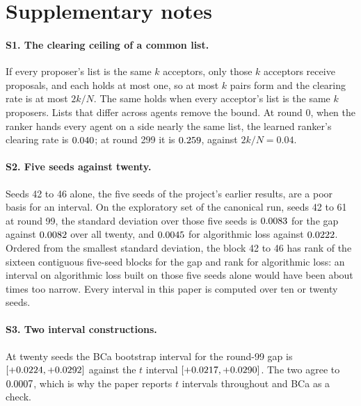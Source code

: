 
\section{Supplementary notes}
\label{app:supplement}

\paragraph{S1. The clearing ceiling of a common list.} If every proposer's list is
the same $k$ acceptors, only those $k$ acceptors receive proposals, and each holds
at most one, so at most $k$ pairs form and the clearing rate is at most $2k/N$.
The same holds when every acceptor's list is the same $k$ proposers. Lists that
differ across agents remove the bound. At round 0, when the ranker hands every
agent on a side nearly the same list, the learned ranker's clearing rate is
$0.040$; at round 299 it is $0.259$, against $2k/N = 0.04$.

\paragraph{S2. Five seeds against twenty.} Seeds 42 to 46 alone, the five seeds of the
project's earlier results, are a poor basis for an interval. On the exploratory set of the canonical
run, seeds 42 to 61 at round 99, the standard deviation over those five seeds is
$0.0083$ for the gap against $0.0082$ over all twenty, and
$0.0045$ for algorithmic loss against $0.0222$. Ordered from the
smallest standard deviation, the block 42 to 46 has rank \rankFiveGap{} of the
sixteen contiguous five-seed blocks for the gap and rank \rankFiveLoss{} for
algorithmic loss: an interval on algorithmic loss built on those five seeds alone
would have been about \sdLossRatio{} times too narrow. Every interval in this paper
is computed over ten or twenty seeds.

\paragraph{S3. Two interval constructions.} At twenty seeds the BCa bootstrap
interval for the round-99 gap is $[+0.0224, +0.0292]$
against the $t$ interval $[+0.0217, +0.0290]$. The two agree to
$0.0007$, which is why the paper reports $t$ intervals throughout and BCa as a
check.


